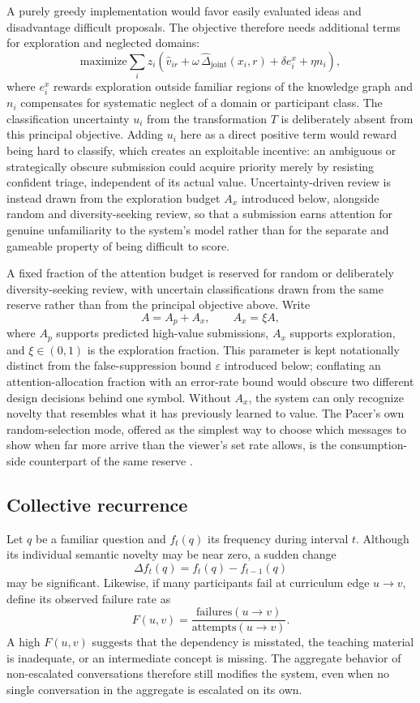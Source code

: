 \documentclass[11pt]{article}
\begin{document}
A purely greedy implementation would favor easily evaluated ideas and disadvantage difficult proposals. The objective therefore needs additional terms for exploration and neglected domains:
\[
\text{maximize} \sum_i z_i \left( \widehat{v}_{ir} + \omega\,\widehat{\Delta}_{\mathrm{joint}}(x_i,r) + \delta e_i^x + \eta n_i \right),
\]
where $e_i^x$ rewards exploration outside familiar regions of the knowledge graph and $n_i$ compensates for systematic neglect of a domain or participant class. The classification uncertainty $u_i$ from the transformation $T$ is deliberately absent from this principal objective. Adding $u_i$ here as a direct positive term would reward being hard to classify, which creates an exploitable incentive: an ambiguous or strategically obscure submission could acquire priority merely by resisting confident triage, independent of its actual value. Uncertainty-driven review is instead drawn from the exploration budget $A_x$ introduced below, alongside random and diversity-seeking review, so that a submission earns attention for genuine unfamiliarity to the system's model rather than for the separate and gameable property of being difficult to score.

A fixed fraction of the attention budget is reserved for random or deliberately diversity-seeking review, with uncertain classifications drawn from the same reserve rather than from the principal objective above. Write
\[
A = A_p + A_x, \qquad A_x = \xi A,
\]
where $A_p$ supports predicted high-value submissions, $A_x$ supports exploration, and $\xi \in (0,1)$ is the exploration fraction. This parameter is kept notationally distinct from the false-suppression bound $\varepsilon$ introduced below; conflating an attention-allocation fraction with an error-rate bound would obscure two different design decisions behind one symbol. Without $A_x$, the system can only recognize novelty that resembles what it has previously learned to value. The Pacer's own random-selection mode, offered as the simplest way to choose which messages to show when far more arrive than the viewer's set rate allows, is the consumption-side counterpart of the same reserve \cite{anderson2022bubblecity}.

\subsection{Collective recurrence}

Let $q$ be a familiar question and $f_t(q)$ its frequency during interval $t$. Although its individual semantic novelty may be near zero, a sudden change
\[
\Delta f_t(q) = f_t(q) - f_{t-1}(q)
\]
may be significant. Likewise, if many participants fail at curriculum edge $u \to v$, define its observed failure rate as
\[
F(u, v) = \frac{\mathrm{failures}(u \to v)}{\mathrm{attempts}(u \to v)}.
\]
A high $F(u, v)$ suggests that the dependency is misstated, the teaching material is inadequate, or an intermediate concept is missing. The aggregate behavior of non-escalated conversations therefore still modifies the system, even when no single conversation in the aggregate is escalated on its own.
\end{document}
